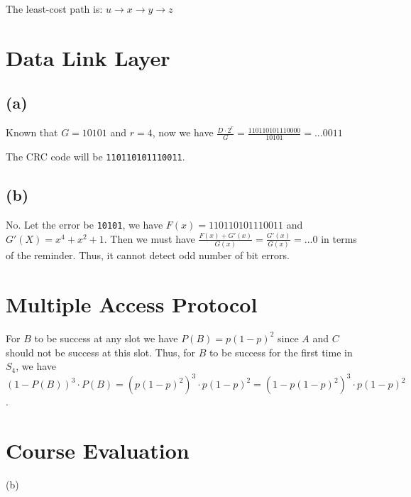 \documentclass[12pt]{article}
\newcommand{\ilc}{\texttt}
\begin{document}
The least-cost path is: $u \rightarrow x  \rightarrow y  \rightarrow z $


\section{Data Link Layer}

\subsection{(a)}

Known that $G = 10101$ and $r = 4$, now we have $\frac{D \cdot 2^r}{G} = \frac{110110101110000}{10101} = ... 0011$

\noindent The CRC code will be \ilc{110110101110011}.

\subsection{(b)}
No. Let the error be \ilc{10101}, we have $F(x) = 110110101110011$ and $G'(X) = x^4+x^2+1$. Then we must have $\frac{F(x)+G'(x)}{G(x)} = \frac{G'(x)}{G(x)} = ... 0$ in terms of the reminder. Thus, it cannot detect odd number of bit errors.

\section{Multiple Access Protocol}

For $B$ to be success at any slot we have $P(B) = p(1-p)^2$ since $A$ and $C$ should not be success at this slot.
Thus, for $B$ to be success for the first time in $S_4$, we have $(1-P(B))^3 \cdot P(B) = (p(1-p)^2)^3 \cdot p(1-p)^2 = (1-p(1-p)^2)^3 \cdot p(1-p)^2$.


\section{Course Evaluation}

(b)
\end{document}
